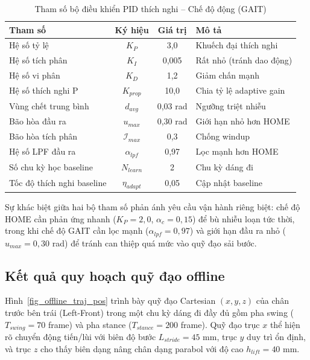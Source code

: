 \begin{table}[H]
\centering
\caption{Tham số bộ điều khiển PID thích nghi -- Chế độ động (GAIT)}
\label{tab:pid_gait_params}
\renewcommand{\arraystretch}{1.3}
\begin{tabular}{|l|c|c|l|}
\hline
\textbf{Tham số} & \textbf{Ký hiệu} & \textbf{Giá trị} & \textbf{Mô tả} \\ \hline
Hệ số tỷ lệ & $K_P$ & 3,0 & Khuếch đại thích nghi \\ \hline
Hệ số tích phân & $K_I$ & 0,005 & Rất nhỏ (tránh dao động) \\ \hline
Hệ số vi phân & $K_D$ & 1,2 & Giảm chấn mạnh \\ \hline
Hệ số thích nghi P & $K_{prop}$ & 10,0 & Chia tỷ lệ adaptive gain \\ \hline
Vùng chết trung bình & $d_{avg}$ & 0,03 rad & Ngưỡng triệt nhiễu \\ \hline
Bão hòa đầu ra & $u_{max}$ & 0,30 rad & Giới hạn nhỏ hơn HOME \\ \hline
Bão hòa tích phân & $\mathcal{I}_{max}$ & 0,3 & Chống windup \\ \hline
Hệ số LPF đầu ra & $\alpha_{lpf}$ & 0,97 & Lọc mạnh hơn HOME \\ \hline
Số chu kỳ học baseline & $N_{learn}$ & 2 & Chu kỳ dáng đi \\ \hline
Tốc độ thích nghi baseline & $\eta_{adapt}$ & 0,05 & Cập nhật baseline \\ \hline
\end{tabular}
\end{table}

Sự khác biệt giữa hai bộ tham số phản ánh yêu cầu vận hành riêng biệt: chế độ HOME cần phản ứng nhanh ($K_P = 2{,}0$, $\alpha_c = 0{,}15$) để bù nhiễu loạn tức thời, trong khi chế độ GAIT cần lọc mạnh ($\alpha_{lpf} = 0{,}97$) và giới hạn đầu ra nhỏ ($u_{max} = 0{,}30$ rad) để tránh can thiệp quá mức vào quỹ đạo sải bước.

\subsection{Kết quả quy hoạch quỹ đạo offline}

Hình~\ref{fig_offline_traj_pos} trình bày quỹ đạo Cartesian $(x, y, z)$ của chân trước bên trái (Left-Front) trong một chu kỳ dáng đi đầy đủ gồm pha swing ($T_{swing} = 70$ frame) và pha stance ($T_{stance} = 200$ frame). Quỹ đạo trục $x$ thể hiện rõ chuyển động tiến/lùi với biên độ bước $L_{stride} = 45$ mm, trục $y$ duy trì ổn định, và trục $z$ cho thấy biên dạng nâng chân dạng parabol với độ cao $h_{lift} = 40$ mm.

